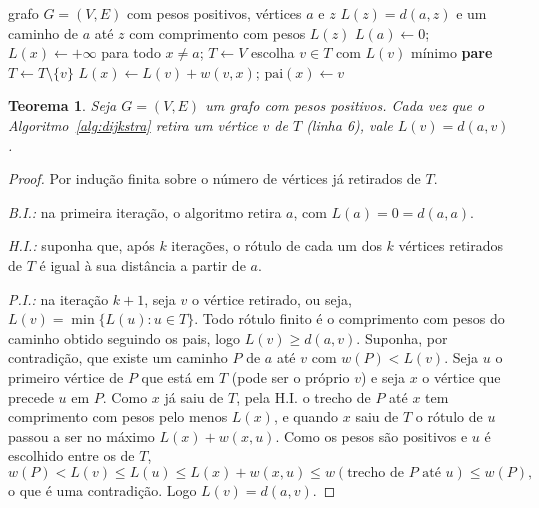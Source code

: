 \documentclass{article}
\theoremstyle{definition}
\theoremstyle{plain}
\newtheorem{teorema}[definicao]{Teorema}
\begin{document}
\begin{algorithm}[H]
\caption{Dijkstra de $a$ até $z$}\label{alg:dijkstra}
\begin{algorithmic}[1]
\Require grafo $G=(V,E)$ com pesos positivos, vértices $a$ e $z$
\Ensure $L(z) = d(a,z)$ e um caminho de $a$ até $z$ com comprimento com pesos $L(z)$
\State $L(a) \gets 0$; $L(x) \gets +\infty$ para todo $x \ne a$; $T \gets V$
    \State escolha $v \in T$ com $L(v)$ mínimo
        \State \textbf{pare} 
    \EndIf
    \State $T \gets T \setminus \{v\}$
            \State $L(x) \gets L(v) + w(v,x)$; $\mathrm{pai}(x) \gets v$
        \EndIf
    \EndFor
\EndWhile
\end{algorithmic}
\end{algorithm}

\begin{teorema}\label{teo:dijkstra}
Seja $G=(V,E)$ um grafo com pesos positivos. Cada vez que o
Algoritmo~\ref{alg:dijkstra} retira um vértice $v$ de $T$ (linha 6), vale
$L(v) = d(a,v)$.
\end{teorema}

\begin{proof}
Por indução finita sobre o número de vértices já retirados de $T$.

\emph{B.I.:} na primeira iteração, o algoritmo retira $a$, com $L(a) = 0 = d(a,a)$.

\emph{H.I.:} suponha que, após $k$ iterações, o rótulo de cada um dos $k$ vértices
retirados de $T$ é igual à sua distância a partir de $a$.

\emph{P.I.:} na iteração $k+1$, seja $v$ o vértice retirado, ou seja,
$L(v) = \min\{L(u) : u \in T\}$. Todo rótulo finito é o comprimento com pesos do
caminho obtido seguindo os pais, logo $L(v) \ge d(a,v)$. Suponha, por contradição,
que existe um caminho $P$ de $a$ até $v$ com $w(P) < L(v)$. Seja $u$ o primeiro
vértice de $P$ que está em $T$ (pode ser o próprio $v$) e seja $x$ o vértice que
precede $u$ em $P$. Como $x$ já saiu de $T$, pela H.I. o trecho de $P$ até $x$ tem
comprimento com pesos pelo menos $L(x)$, e quando $x$ saiu de $T$ o rótulo de $u$
passou a ser no máximo $L(x) + w(x,u)$. Como os pesos são positivos e $u$ é
escolhido entre os de $T$,
\[
    w(P) < L(v) \le L(u) \le L(x) + w(x,u) \le
    w(\text{trecho de } P \text{ até } u) \le w(P),
\]
o que é uma contradição. Logo $L(v) = d(a,v)$.
\end{proof}
\end{document}
